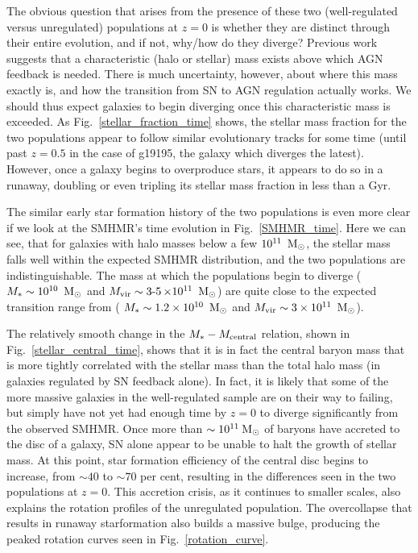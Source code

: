 The obvious question that arises from the presence of these two (well-regulated
versus  unregulated) populations at $z=0$ is whether they are distinct through
their entire evolution, and if not, why/how do they diverge?  Previous work
suggests that a characteristic (halo or stellar) mass exists above which AGN
feedback is needed.  There is much uncertainty, however, about where this mass
exactly is, and how the transition from SN to AGN regulation actually works. We
should thus expect galaxies to begin diverging once this characteristic mass is
exceeded.  As Fig.~\ref{stellar_fraction_time} shows, the stellar mass
fraction for the two populations appear to follow similar evolutionary tracks
for some time (until past $z=0.5$ in the case of g19195, the galaxy which
diverges the latest).  However, once a galaxy begins to overproduce stars, it
appears to do so in a runaway, doubling or even tripling its stellar mass
fraction in less than a Gyr.

The similar early star formation history of the two populations is even more
clear if we look at the SMHMR's time evolution in Fig.~\ref{SMHMR_time}.  Here
we can see, that for galaxies with halo masses below a few $10^{11}\;\>{\rm M_{\odot}}$,
the stellar mass falls well within the expected SMHMR distribution, and the two
populations are indistinguishable.  The mass at which the populations begin to
diverge ( $M_*\sim10^{10}\;\>{\rm M_{\odot}}$ and $M_{\rm vir}\sim\operatorname{3-
5}\times10^{11}\;\>{\rm M_{\odot}}$) are quite close to the expected transition range
from \citet{Shankar2006} ( $M_*\sim1.2\times10^{10}\;\>{\rm M_{\odot}}$ and
$M_{\rm vir}\sim3\times10^{11}\;\>{\rm M_{\odot}}$).

The relatively smooth change in the $M_*-M_{\rm central}$ relation, shown in
Fig.~\ref{stellar_central_time}, shows that it is in fact the central baryon
mass that is more tightly correlated with the stellar mass than the total halo
mass (in galaxies regulated by SN feedback alone). In fact, it is likely that
some of the more massive galaxies in the well-regulated sample are on their way
to failing, but simply have not yet had enough time by $z=0$ to diverge
significantly from the observed SMHMR.  Once more than $\sim10^{11}\>{\rm M_{\odot}}$ of
baryons have accreted to the disc of a galaxy, SN alone appear to be unable to
halt the growth of stellar mass.  At this point, star formation efficiency of
the central disc begins to increase, from $\sim40$ to $\sim70$ per cent, resulting in
the differences seen in the two populations at $z=0$.  This accretion crisis, as
it continues to smaller scales, also explains the rotation profiles of the
unregulated population.  The overcollapse that results in runaway starformation
also builds a massive bulge, producing the peaked rotation curves seen in
Fig.~\ref{rotation_curve}.

